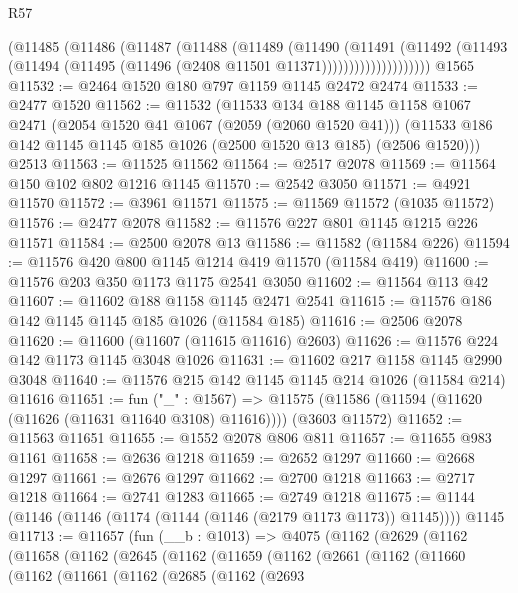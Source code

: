 \begin{lexlean}{R57}
\begin{coremodule}
                  (@11485
                    (@11486
                      (@11487
                        (@11488
                          (@11489
                            (@11490
                              (@11491
                                (@11492
                                  (@11493
                                    (@11494 (@11495 (@11496 (@2408 @11501 @11371))))))))))))))))))))
    @1565
@11532 := @2464 @1520 @180 @797 @1159 @1145 @2472 @2474
@11533 := @2477 @1520
@11562 := @11532
    (@11533
      @134
      @188
      @1145
      @1158
      @1067
      @2471
      (@2054 @1520 @41 @1067 (@2059 (@2060 @1520 @41)))
      (@11533 @186 @142 @1145 @1145 @185 @1026 (@2500 @1520 @13 @185) (@2506 @1520)))
    @2513
@11563 := @11525 @11562
@11564 := @2517 @2078
@11569 := @11564 @150 @102 @802 @1216 @1145
@11570 := @2542 @3050
@11571 := @4921 @11570
@11572 := @3961 @11571
@11575 := @11569 @11572 (@1035 @11572)
@11576 := @2477 @2078
@11582 := @11576 @227 @801 @1145 @1215 @226 @11571
@11584 := @2500 @2078 @13
@11586 := @11582 (@11584 @226)
@11594 := @11576 @420 @800 @1145 @1214 @419 @11570 (@11584 @419)
@11600 := @11576 @203 @350 @1173 @1175 @2541 @3050
@11602 := @11564 @113 @42
@11607 := @11602 @188 @1158 @1145 @2471 @2541
@11615 := @11576 @186 @142 @1145 @1145 @185 @1026 (@11584 @185)
@11616 := @2506 @2078
@11620 := @11600 (@11607 (@11615 @11616) @2603)
@11626 := @11576 @224 @142 @1173 @1145 @3048 @1026
@11631 := @11602 @217 @1158 @1145 @2990 @3048
@11640 := @11576 @215 @142 @1145 @1145 @214 @1026 (@11584 @214) @11616
@11651 := fun ("_" : @1567) =>
  @11575 (@11586 (@11594 (@11620 (@11626 (@11631 @11640 @3108) @11616)))) (@3603 @11572)
@11652 := @11563 @11651
@11655 := @1552 @2078 @806 @811
@11657 := @11655 @983 @1161
@11658 := @2636 @1218
@11659 := @2652 @1297
@11660 := @2668 @1297
@11661 := @2676 @1297
@11662 := @2700 @1218
@11663 := @2717 @1218
@11664 := @2741 @1283
@11665 := @2749 @1218
@11675 := @1144 (@1146 (@1146 (@1174 (@1144 (@1146 (@2179 @1173 @1173)) @1145)))) @1145
@11713 := @11657
    (fun (__b : @1013) =>
    @4075
      (@1162
        (@2629
          (@1162
            (@11658
              (@1162
                (@2645
                  (@1162
                    (@11659
                      (@1162
                        (@2661
                          (@1162
                            (@11660
                              (@1162
                                (@11661
                                  (@1162
                                    (@2685
                                      (@1162
                                        (@2693

\end{coremodule}
\end{lexlean}
